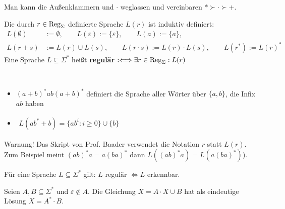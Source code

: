 Man kann die Außenklammern und $\cdot$ weglassen und vereinbaren $\ast\succ\cdot\succ +$.

\begin{definition}\label{def5.3}
	Die durch $r\in\operatorname{Reg}_\Sigma$ definierte Sprache $L(r)$ ist induktiv definiert:
	\begin{align*}
		L(\emptyset)&:=\emptyset,\qquad L(\varepsilon):=\lbrace\varepsilon\rbrace,\qquad L(a):=\lbrace a\rbrace,\\
		L(r+s)&:=L(r)\cup L(s),\qquad L(r\cdot s):=L(r)\cdot L(s),\qquad L(r^\ast):=L(r)^\ast
	\end{align*}
	Eine Sprache $L\subseteq\Sigma^\ast$ heißt \textbf{regulär} $:\Longleftrightarrow\exists r\in\operatorname{Reg}_\Sigma:L(r)$
\end{definition}

\begin{beispiel}\label{beisp5.4}\
	\begin{itemize}
		\item $(a+b)^\ast ab(a+b)^\ast$ definiert die Sprache aller Wörter über $\lbrace a,b\rbrace$, die Infix $ab$ haben
		\item $\begin{aligned}
			L(ab^\ast+b)=\big\lbrace ab^i:i\geq0\big\rbrace\cup\lbrace b\rbrace
		\end{aligned}$
	\end{itemize}
\end{beispiel}

Warnung! Das Skript von Prof. Baader verwendet die Notation $r$ statt $L(r)$.
Zum Beispiel meint $(ab)^\ast a=a(ba)^\ast$ dann $L((ab)^\ast a)=L(a(ba)^\ast))$.

\begin{satz}[Kleene]\label{satz5.5Kleene}\enter
	Für eine Sprache $L\subseteq\Sigma^\ast$ gilt: $L$ regulär $\Longleftrightarrow L$ erkennbar.
\end{satz}

\begin{lemma}[Arden]\label{lemma5.7Arden}\enter
	Seien $A,B\subseteq\Sigma^\ast$ und $\varepsilon\not\in A$.
	Die Gleichung $X=A\cdot X\cup B$ hat als eindeutige Lösung $X=A^\ast\cdot B$.
\end{lemma}
